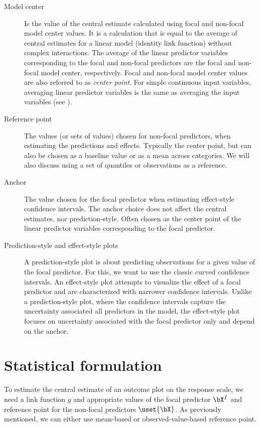 \begin{description}
\item [Model center] Is the value of the central estimate calculated using focal and non-focal model center values. It is a calculation that is equal to the average of central estimates for a linear model (identity link function) without complex interactions. The average of the linear predictor variables corresponding to the focal and non-focal predictors are the focal and non-focal model center, respectively. Focal and non-focal model center values are also referred to as \emph{center point}. For simple continuous input variables, averaging linear predictor variables is the same as averaging the input variables (see ).

\item [Reference point] The values (or sets of values) chosen for non-focal predictors, when estimating the predictions and effects. Typically the center point, but can also be chosen as a baseline value or as a mean across categories. We will also discuss using a set of quantiles or observations as a reference.

\item [Anchor] The value chosen for the focal predictor when estimating effect-style confidence intervals. The anchor choice does not affect the central estimates, nor prediction-style. Often chosen as the center point of the linear predictor variables corresponding to the focal predictor. 

\item [Prediction-style and effect-style plots] A prediction-style plot is about predicting observations for a given value of the focal predictor. For this, we want to use the classic curved confidence intervals. An effect-style plot attempts to visualize the effect of a focal predictor and are characterized with narrower confidence intervals. Unlike a prediction-style plot, where the confidence intervals capture the uncertainty associated all predictors in the model, the effect-style plot focuses on uncertainty associated with the focal predictor only and depend on the anchor.

\end{description}

\section{Statistical formulation}

To estimate the central estimate of an outcome plot on the response scale, we need a link function $g$ and appropriate values of the focal predictor $\bX^{f}$ and reference point for the non-focal predictors $\uset{{\bX}}$. As previously mentioned, we can either use mean-based or observed-value-based reference point. 

